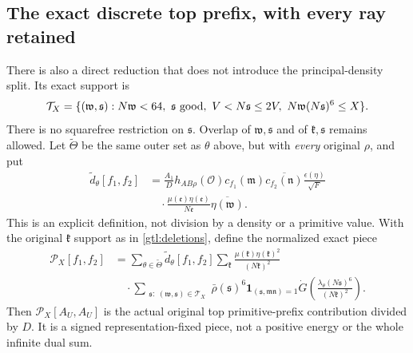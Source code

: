 \subsection{The exact discrete top prefix, with every ray retained}
\label{gtl:discrete}
There is also a direct reduction that does not introduce the
principal-density split. Its exact support is
\begin{equation}\label{gtl:discrete-support}
 \mathcal T_X=
 \{(\mathfrak w,\mathfrak s):N\mathfrak w<64,\ \mathfrak s\ {\rm good},
       \ V<N\mathfrak s\le2V,\ N\mathfrak w(N\mathfrak s)^6\le X\}.
\end{equation}
There is no squarefree restriction on $\mathfrak s$.
Overlap of $\mathfrak w,\mathfrak s$ and of
$\mathfrak k,\mathfrak s$ remains allowed.
Let $\widetilde\Theta$ be the same outer set as $\theta$ above,
but with \emph{every} original $\rho$, and put
\begin{equation}\label{gtl:discrete-coefficient}
 \begin{aligned}
 \widetilde d_\theta[f_1,f_2]
 &=\frac{A_1}{D}h_{AB\rho}(\mathcal O)
       c_{f_1}(\mathfrak m)\overline{c_{f_2}(\mathfrak n)}
          \frac{\epsilon(\eta)}{\sqrt F}\\
 &\quad\cdot\frac{\mu(\mathfrak e)\eta(\mathfrak e)}{N\mathfrak e}
                                  \overline{\eta(\mathfrak w)} .
 \end{aligned}
\end{equation}
This is an explicit definition, not division by a density or a
primitive value. With the original $\mathfrak k$ support as in
\eqref{gtl:deletions}, define the normalized exact piece
\begin{equation}\label{gtl:direct-prefix}
 \begin{aligned}
 \mathcal P_X[f_1,f_2]
 &=\sum_{\theta\in\widetilde\Theta}\widetilde d_\theta[f_1,f_2]
     \sum_{\mathfrak k}
           \frac{\mu(\mathfrak k)\eta(\mathfrak k)^2}
                {(N\mathfrak k)^2}\\
 &\quad\cdot
 \sum_{\substack{\mathfrak s:\;(\mathfrak w,\mathfrak s)\in\mathcal T_X}}
   \bar\rho(\mathfrak s)^6
       \mathbf1_{(\mathfrak s,\mathfrak m\mathfrak n)=1}
       \dot G\left(\frac{\lambda_\theta(N\mathfrak s)^6}
                              {(N\mathfrak k)^2}\right).
 \end{aligned}
\end{equation}
Then $\mathcal P_X[A_U,A_U]$ is the actual original top
primitive-prefix contribution divided by $D$.
It is a signed representation-fixed piece, not a positive energy
or the whole infinite dual sum.

